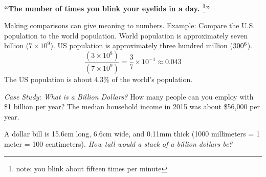 \documentclass[12pt]{article}
\begin{document}
\textbf{``The number of times you blink your eyelids in a day. \footnote{note: you blink about fifteen times per minute}'' }= 
\vspace{0.5in}

\pagebreak
Making comparisons can give meaning to numbers.
Example: Compare the U.S. population to the world population.
World population is approximately seven billion ($7\times 10^9$). US population is approximately three hundred million ($300\time 10^6$). 
\begin{equation}
\frac{(3 \times 10^{8})}{(7\times 10^{9})} = \frac{3}{7} \times 10^{-1} \approx 0.043
\end{equation} 	
The US population is about 4.3\% of the world's population.

\vspace{0.5in}
\emph{Case Study: What is a Billion Dollars?}
How many people can you employ with \$1 billion per year? The median household income in 2015 was about \$56,000 per year.

\vspace{2in}

A dollar bill is 15.6cm long, 6.6cm wide, and 0.11mm thick (1000 millimeters = 1 meter = 100 centimeters). 
\emph{How tall would a stack of a billion dollars be?}
\end{document}
